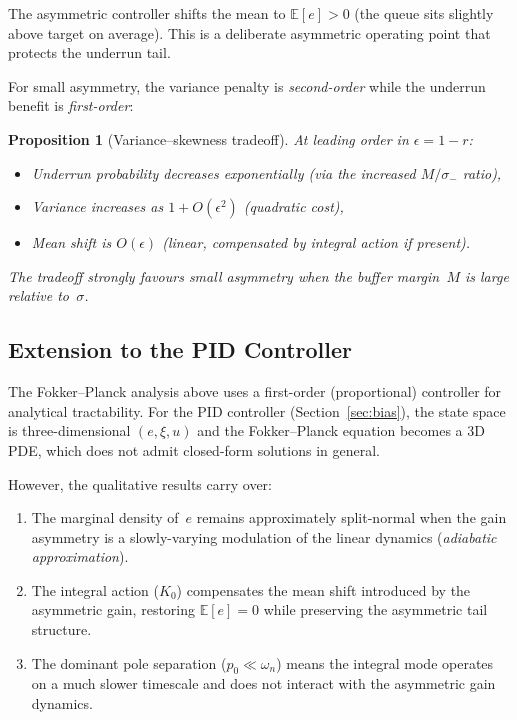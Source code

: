 \documentclass[11pt, a4paper]{article}
\theoremstyle{definition}
\theoremstyle{plain}
\newtheorem{proposition}[theorem]{Proposition}
\theoremstyle{remark}
\newcommand{\E}{\mathbb{E}}
\begin{document}
The asymmetric controller shifts the mean to $\E[e] > 0$
(the queue sits slightly above target on average).  This is a
deliberate asymmetric operating point that protects the underrun
tail.

For small asymmetry, the variance penalty is \emph{second-order}
while the underrun benefit is \emph{first-order}:

\begin{proposition}[Variance--skewness tradeoff]%
\label{prop:var-skew}
  At leading order in $\epsilon = 1 - r$:
  \begin{itemize}
    \item Underrun probability decreases exponentially
      (via the increased $M/\sigma_-$ ratio),
    \item Variance increases as $1 + O(\epsilon^2)$
      (quadratic cost),
    \item Mean shift is $O(\epsilon)$ (linear, compensated by
      integral action if present).
  \end{itemize}
  The tradeoff strongly favours small asymmetry when the
  buffer margin~$M$ is large relative to~$\sigma$.
\end{proposition}

\subsection{Extension to the PID Controller}%
\label{sec:asym-extension}

The Fokker--Planck analysis above uses a first-order
(proportional) controller for analytical tractability.  For the
PID controller (Section~\ref{sec:bias}), the state space is
three-dimensional $(e, \xi, u)$ and the Fokker--Planck equation
becomes a 3D PDE, which does not admit closed-form solutions in
general.

However, the qualitative results carry over:
\begin{enumerate}
  \item The marginal density of~$e$ remains approximately
    split-normal when the gain asymmetry is a slowly-varying
    modulation of the linear dynamics (\emph{adiabatic
    approximation}).
  \item The integral action ($K_0$) compensates the mean shift
    introduced by the asymmetric gain, restoring $\E[e] = 0$
    while preserving the asymmetric tail structure.
  \item The dominant pole separation ($p_0 \ll \omega_n$) means
    the integral mode operates on a much slower timescale
    and does not interact with the asymmetric gain dynamics.
\end{enumerate}
\end{document}
